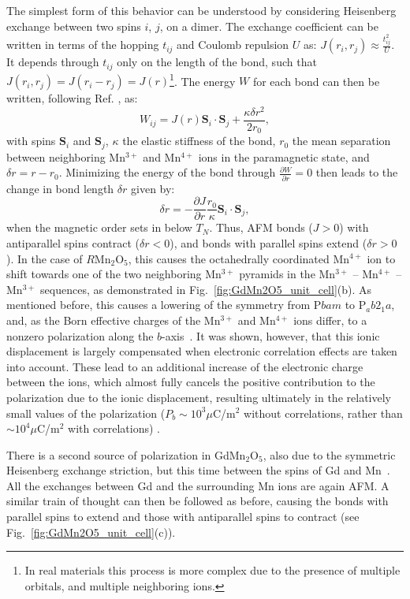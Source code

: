 The simplest form of this behavior can be understood by considering Heisenberg exchange between two spins $i$, $j$, on a dimer.
The exchange coefficient can be written in terms of the hopping $t_{ij}$ and Coulomb repulsion $U$ as: $J(r_i, r_j)\approx \frac{t_{ij}^2}{U}$.
It depends through $t_{ij}$ only on the length of the bond, such that $J(r_i, r_j) = J(r_i - r_j) = J(r)$\footnote{In real materials this process is more complex due to the presence of multiple orbitals, and multiple neighboring ions.}.
The energy $W$ for each bond can then be written, following Ref. \cite{Harris1972}, as:
\begin{equation}
	W_{ij} = J(r)\bm{S}_i \cdot \bm{S}_j + \frac{\kappa \delta r^2}{2r_0},
\end{equation}
with spins $\bm{S}_i$ and $\bm{S}_j$, $\kappa$ the elastic stiffness of the bond, $r_0$ the mean separation between neighboring Mn$^{3+}$ and Mn$^{4+}$ ions in the paramagnetic state, and $\delta r = r - r_0$.
Minimizing the energy of the bond through $\frac{\partial W}{\partial r} = 0$ then leads to the change in bond length $\delta r$ given by:
\begin{equation}
	\delta r = -\frac{\partial J}{\partial r}\frac{r_0}{\kappa}\bm{S}_i \cdot \bm{S}_j,
\end{equation}
when the magnetic order sets in below $T_N$. Thus, AFM bonds ($J > 0$) with antiparallel spins contract ($\delta r < 0$), and bonds with parallel spins extend ($\delta r > 0$).
In the case of $R$Mn$_2$O$_5$, this causes the octahedrally coordinated Mn$^{4+}$ ion to shift towards one of the two neighboring Mn$^{3+}$ pyramids in the Mn$^{3+}$ -- Mn$^{4+}$ -- Mn$^{3+}$ sequences, as demonstrated in Fig.~\ref{fig:GdMn2O5_unit_cell}(b).
As mentioned before, this causes a lowering of the symmetry from P$bam$ to P$_ab2_1a$, and, as the Born effective charges of the Mn$^{3+}$ and Mn$^{4+}$ ions differ, to a nonzero polarization along the $b$-axis~\cite{Khomskii2009}.
It was shown, however, that this ionic displacement is largely compensated when electronic correlation effects are taken into account.
These lead to an additional increase of the electronic charge between the ions, which almost fully cancels the positive contribution to the polarization due to the ionic displacement, resulting ultimately in the relatively small values of the polarization ($P_b\sim 10^3 \mu $C/m$^2$ without correlations, rather than $\sim 10^4 \mu $C/m$^2$ with correlations) \cite{Giovannetti2008}.

There is a second source of polarization in GdMn$_2$O$_5$, also due to the symmetric Heisenberg exchange striction, but this time between the spins of Gd and Mn~\cite{Lee13}.
All the exchanges between Gd and the surrounding Mn ions are again AFM.
A similar train of thought can then be followed as before, causing the bonds with parallel spins to extend and those with antiparallel spins to contract (see Fig.~\ref{fig:GdMn2O5_unit_cell}(c)).

